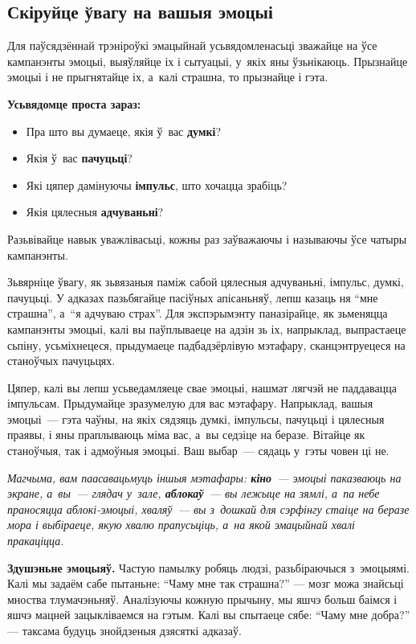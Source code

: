 \subsection*{Скіруйце ўвагу на вашыя эмоцыі}

Для паўсядзённай трэніроўкі эмацыйнай усьвядомленасьці зважайце на ўсе кампанэнты эмоцыі, выяўляйце іх і сытуацыі, у~якіх яны ўзьнікаюць. Прызнайце эмоцыі і не прыгнятайце іх, а~калі страшна, то прызнайце і гэта.

\textbf{Усьвядомце проста зараз:} 
\begin{itemize}
  \item Пра што вы думаеце, якія ў~вас \textbf{думкі}?
  \item Якія ў~вас \textbf{пачуцьці}?
  \item Які цяпер дамінуючы \textbf{імпульс}, што хочацца зрабіць?
  \item Якія цялесныя \textbf{адчуваньні}?
\end{itemize}

Разьвівайце навык уважлівасьці, кожны раз заўважаючы і называючы ўсе чатыры кампанэнты.

Зьвярніце ўвагу, як зьвязаныя паміж сабой цялесныя адчуваньні, імпульс, думкі, пачуцьці. У адказах пазьбягайце пасіўных апісаньняў, лепш казаць ня ``мне страшна'', а~``я адчуваю страх''. Для экспэрымэнту паназірайце, як зьменяцца кампанэнты эмоцыі, калі вы паўплываеце на адзін зь іх, напрыклад, выпрастаеце сьпіну, усьміхнецеся, прыдумаеце падбадзёрлівую мэтафару, сканцэнтруецеся на станоўчых пачуцьцях.


Цяпер, калі вы лепш усьведамляеце свае эмоцыі, нашмат лягчэй не паддавацца імпульсам. Прыдумайце зразумелую для вас мэтафару. Напрыклад, вашыя эмоцыі~--- гэта чаўны, на якіх сядзяць думкі, імпульсы, пачуцьці і цялесныя праявы, і яны праплываюць міма вас, а~вы седзіце на беразе. Вітайце як станоўчыя, так і адмоўныя эмоцыі. Ваш выбар~--- сядаць у~гэты човен ці не.

\emph{Магчыма, вам паасавацьмуць іншыя мэтафары: \textbf{кіно}~--- эмоцыі паказваюць на экране, а~вы~--- глядач у~зале, \textbf{аблокаў}~--- вы лежыце на зямлі, а~па небе праносяцца аблокі-эмоцыі, хваляў~--- вы з~дошкай для сэрфінгу стаіце на беразе мора і выбіраеце, якую хвалю прапусьціць, а~на якой эмацыйнай хвалі пракаціцца.}

\textbf{Здушэньне эмоцыяў.} Частую памылку робяць людзі, разьбіраючыся з~эмоцыямі. Калі мы задаём сабе пытаньне: ``Чаму мне так страшна?'' --- мозг можа знайсьці мноства тлумачэньняў. Аналізуючы кожную прычыну, мы яшчэ больш баімся і яшчэ мацней зацыкліваемся на гэтым. Калі вы спытаеце сябе: ``Чаму мне добра?'' --- таксама будуць знойдзеныя дзясяткі адказаў.

